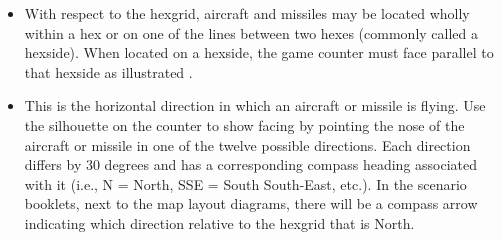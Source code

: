 \begin{itemize}
    \item {} With respect to the hexgrid, aircraft and missiles may be located wholly within a hex or on one of the lines between two hexes (commonly called a hexside). When located on a hexside, the game counter must face parallel to that hexside as illustrated . 


    \item {} This is the horizontal direction in which an aircraft or missile is flying. Use the silhouette on the counter to show facing by pointing the nose of the aircraft or missile in one of the twelve possible directions. Each direction differs by 30 degrees and has a corresponding compass heading associated with it (i.e., N = North, SSE = South South-East, etc.). In the scenario booklets, next to the map layout diagrams, there will be a compass arrow indicating which direction relative to the hexgrid that is North. 


\end{itemize}
